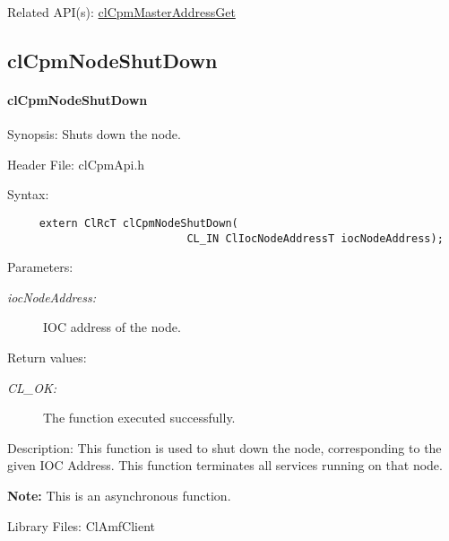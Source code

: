 {\begin{Desc}
\item[Related API(s):]\hyperlink{group__group14}{cl\-Cpm\-Master\-Address\-Get} \end{Desc}
\newpage






\subsection{clCpmNodeShutDown}
\hypertarget{pagecpm137}{}\paragraph{cl\-Cpm\-Node\-Shut\-Down}\label{pagecpm137}
\begin{Desc}
\item[Synopsis:]Shuts down the node.\end{Desc}
\begin{Desc}
\item[Header File:]clCpmApi.h\end{Desc}
\begin{Desc}
\item[Syntax:]

\footnotesize\begin{verbatim}     extern ClRcT clCpmNodeShutDown(
                  			CL_IN ClIocNodeAddressT iocNodeAddress);
\end{verbatim}
\normalsize
\end{Desc}
\begin{Desc}
\item[Parameters:]
\begin{description}
\item[{\em ioc\-Node\-Address:}]IOC address of the node.\end{description}
\end{Desc}
\begin{Desc}
\item[Return values:]
\begin{description}
\item[{\em CL\_\-OK:}]The function executed successfully.\end{description}
\end{Desc}
\begin{Desc}
\item[Description:]This function is used to shut down the node, corresponding to the given IOC Address. This function terminates all services running on 
that node.\end{Desc}
{\bf Note:} This is an asynchronous function.
\begin{Desc}
\item[Library Files:]Cl\-Amf\-Client\end{Desc}

}
